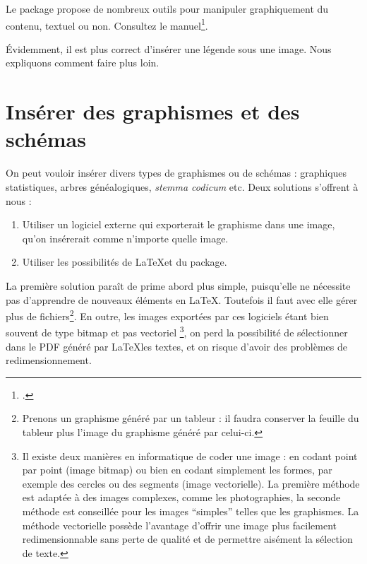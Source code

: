 \begin{plusloins}
Le package  propose de nombreux outils pour manipuler graphiquement du contenu, textuel ou non. Consultez le manuel\footcite{graphicx}.
\end{plusloins}

\begin{attention}
    Évidemment, il est plus correct d'insérer une légende sous une image. Nous expliquons comment faire plus loin.
\end{attention}

\section{Insérer des graphismes et des schémas}

On peut vouloir insérer divers types de graphismes ou de schémas : graphiques statistiques, arbres généalogiques, \emph{stemma codicum} etc.
Deux solutions s'offrent à nous :
\begin{enumerate}
\item Utiliser un logiciel externe qui exporterait le graphisme dans une image, qu'on insérerait comme n'importe quelle image.
\item Utiliser les possibilités de \LaTeX et du package.\label{TikZ}
\end{enumerate}

La première solution paraît de prime abord plus simple, puisqu'elle ne nécessite pas d'apprendre de nouveaux éléments en \LaTeX. Toutefois il faut avec elle gérer plus de fichiers\footnote{Prenons un graphisme généré par un tableur : il faudra conserver la feuille du tableur plus l'image du graphisme généré par celui-ci.}. En outre, les images exportées par ces logiciels étant bien souvent de type bitmap et  pas vectoriel%
\footnote{Il existe deux manières en informatique de coder une image : en codant point par point (image bitmap) ou bien en codant simplement les formes, par exemple des cercles ou des segments (image vectorielle). La première méthode est adaptée à des images complexes, comme les photographies,  la seconde méthode est conseillée pour les images \enquote{simples} telles que les graphismes. La méthode vectorielle possède l'avantage d'offrir une image plus facilement redimensionnable  sans perte de qualité et de permettre aisément la sélection de texte.},
on perd la possibilité de sélectionner dans le PDF généré par \LaTeX les textes, et on risque d'avoir des problèmes de redimensionnement.

